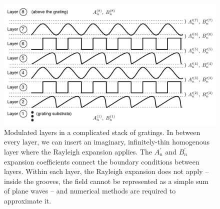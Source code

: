 \begin{figure}[p] %
   \centering
   \includegraphics[scale=0.75]{../data/Chapter2/2d_stacksOfGratings/2d_2.pdf} 
   \caption[Modulated layers in a complicated stack of gratings.  In between every layer, we can insert an imaginary, infinitely-thin homogenous layer where the Rayleigh expansion applies.]{Modulated layers in a complicated stack of gratings.  In between every layer, we can insert an imaginary, infinitely-thin homogenous layer where the Rayleigh expansion applies.  The $A^{\prime}_n$ and $B^{\prime}_n$ expansion coefficients connect the boundary conditions between layers.  Within each layer, the Rayleigh expansion does not apply -- inside the grooves, the field cannot be represented as a simple sum of plane waves -- and numerical methods are required to approximate it.}
   \label{2d-2}
\end{figure}

